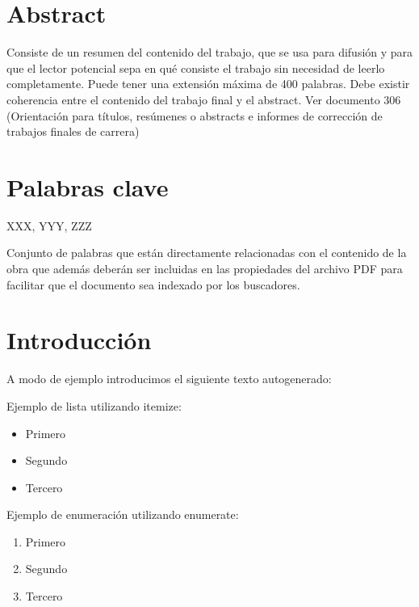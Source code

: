 \documentclass[12pt,a4paper,oneside]{book}
\begin{document}
\chapter*{Abstract}

Consiste de un resumen del contenido del trabajo, que se usa para difusión y para que el lector potencial sepa en qué consiste el trabajo sin necesidad de leerlo completamente. Puede tener una extensión máxima de 400 palabras. Debe existir coherencia entre el contenido del trabajo final y el abstract. Ver documento 306 (Orientación para títulos, resúmenes o abstracts e informes de corrección de trabajos finales de carrera)



\chapter*{Palabras clave}

XXX, YYY, ZZZ


\vspace{1cm}

Conjunto de palabras que están directamente relacionadas con el contenido de la obra que además deberán ser incluidas en las
propiedades del archivo PDF para facilitar que el documento sea indexado por los buscadores.


\tableofcontents


\chapter{Introducción} 
\label{intro} %

A modo de ejemplo introducimos el siguiente texto autogenerado:
\lipsum[1]


Ejemplo de lista utilizando itemize:
\begin{itemize}
    \item Primero
    \item Segundo
    \item Tercero\\
\end{itemize}

Ejemplo de enumeración utilizando enumerate:
\begin{enumerate}
    \item Primero
    \item Segundo
    \item Tercero\\
\end{enumerate}
\end{document}
